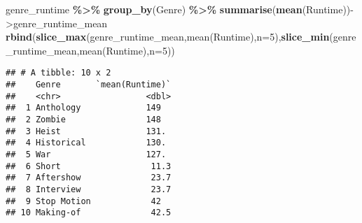 \documentclass[
]{article}
\newenvironment{Shaded}{\begin{snugshade}}{\end{snugshade}}
\newcommand{\AttributeTok}[1]{\textcolor[rgb]{0.13,0.29,0.53}{#1}}
\newcommand{\DecValTok}[1]{\textcolor[rgb]{0.00,0.00,0.81}{#1}}
\newcommand{\FunctionTok}[1]{\textcolor[rgb]{0.13,0.29,0.53}{\textbf{#1}}}
\newcommand{\NormalTok}[1]{#1}
\newcommand{\OtherTok}[1]{\textcolor[rgb]{0.56,0.35,0.01}{#1}}
\newcommand{\SpecialCharTok}[1]{\textcolor[rgb]{0.81,0.36,0.00}{\textbf{#1}}}
\newcommand{\StringTok}[1]{\textcolor[rgb]{0.31,0.60,0.02}{#1}}
\begin{document}
\begin{Shaded}
\begin{Highlighting}[]
\NormalTok{genre\_runtime }\SpecialCharTok{\%\textgreater{}\%} \FunctionTok{group\_by}\NormalTok{(Genre) }\SpecialCharTok{\%\textgreater{}\%} \FunctionTok{summarise}\NormalTok{(}\FunctionTok{mean}\NormalTok{(Runtime))}\OtherTok{{-}\textgreater{}}\NormalTok{genre\_runtime\_mean}
\FunctionTok{rbind}\NormalTok{(}\FunctionTok{slice\_max}\NormalTok{(genre\_runtime\_mean,}\StringTok{\textasciigrave{}}\AttributeTok{mean(Runtime)}\StringTok{\textasciigrave{}}\NormalTok{,}\AttributeTok{n=}\DecValTok{5}\NormalTok{),}\FunctionTok{slice\_min}\NormalTok{(genre\_runtime\_mean,}\StringTok{\textasciigrave{}}\AttributeTok{mean(Runtime)}\StringTok{\textasciigrave{}}\NormalTok{,}\AttributeTok{n=}\DecValTok{5}\NormalTok{))}
\end{Highlighting}
\end{Shaded}

\begin{verbatim}
## # A tibble: 10 x 2
##    Genre       `mean(Runtime)`
##    <chr>                 <dbl>
##  1 Anthology             149  
##  2 Zombie                148  
##  3 Heist                 131. 
##  4 Historical            130. 
##  5 War                   127. 
##  6 Short                  11.3
##  7 Aftershow              23.7
##  8 Interview              23.7
##  9 Stop Motion            42  
## 10 Making-of              42.5
\end{verbatim}
\end{document}
